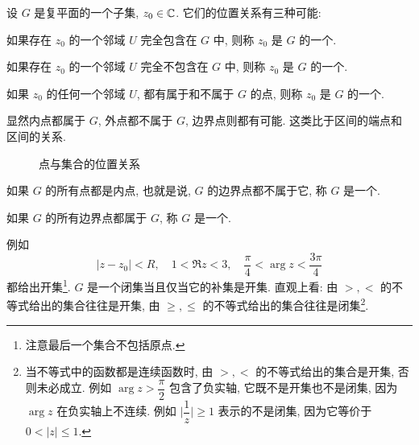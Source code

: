 设 $G$ 是复平面的一个子集, $z_0\in{\mathbb{C}}$.
它们的位置关系有三种可能:
\begin{enumpar}
  \item 如果存在 $z_0$ 的一个邻域 $U$ 完全包含在 $G$ 中, 则称 $z_0$ 是 $G$ 的一个.
  \item 如果存在 $z_0$ 的一个邻域 $U$ 完全不包含在 $G$ 中, 则称 $z_0$ 是 $G$ 的一个.
  \item 如果 $z_0$ 的任何一个邻域 $U$, 都有属于和不属于 $G$ 的点, 则称 $z_0$ 是 $G$ 的一个.
\end{enumpar}\par\noindent
显然内点都属于 $G$, 外点都不属于 $G$, 边界点则都有可能.
这类比于区间的端点和区间的关系.

\begin{figure}
  \centering
  \caption{点与集合的位置关系}
\end{figure}

\begin{definition}
  \begin{enumpar}
    \item 如果 $G$ 的所有点都是内点, 也就是说, $G$ 的边界点都不属于它, 称 $G$ 是一个.
    \item 如果 $G$ 的所有边界点都属于 $G$, 称 $G$ 是一个.
  \end{enumpar}
\end{definition}
例如
  \[|z-z_0|<R,\quad 1<\Re z<3,\quad\frac\pi4<\arg z<\dfrac{3\pi}4\]
都给出开集\footnote{注意最后一个集合不包括原点.}.
$G$ 是一个闭集当且仅当它的补集是开集.
直观上看: 由 $>,<$ 的不等式给出的集合往往是开集, 由 $\ge,\le$ 的不等式给出的集合往往是闭集\footnote{%
  当不等式中的函数都是连续函数时, 由 $>,<$ 的不等式给出的集合是开集, 否则未必成立.
  例如 $\arg z>\dfrac\pi2$ 包含了负实轴, 它既不是开集也不是闭集, 因为 $\arg z$ 在负实轴上不连续.
  例如 $\bigl|\dfrac1z\bigr|\ge 1$ 表示的不是闭集, 因为它等价于 $0<|z|\le1$.
}.

